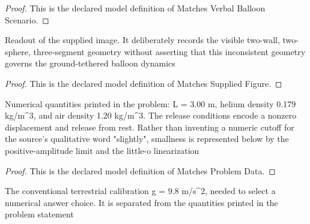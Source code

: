 \begin{proof}
  This is the declared model definition of Matches Verbal Balloon Scenario.
\end{proof}
\begin{definition}
  \label{def:physics:phyx-mini-0234:phyxminiproblems-problemphyxmini0234-matchessuppliedfigure}
  Readout of the supplied image. It deliberately records the visible two-wall, two-sphere, three-segment geometry without asserting that this inconsistent geometry governs the ground-tethered balloon dynamics
\end{definition}
\begin{proof}
  This is the declared model definition of Matches Supplied Figure.
\end{proof}
\begin{definition}
  \label{def:physics:phyx-mini-0234:phyxminiproblems-problemphyxmini0234-matchesproblemdata}
  Numerical quantities printed in the problem: L = 3.00 m, helium density 0.179 kg/m\textasciicircum{}3, and air density 1.20 kg/m\textasciicircum{}3. The release conditions encode a nonzero displacement and release from rest. Rather than inventing a numeric cutoff for the source's qualitative word "slightly", smallness is represented below by the positive-amplitude limit and the little-o linearization
\end{definition}
\begin{proof}
  This is the declared model definition of Matches Problem Data.
\end{proof}
\begin{definition}
  \label{def:physics:phyx-mini-0234:phyxminiproblems-problemphyxmini0234-usesstandardgravity}
  The conventional terrestrial calibration g = 9.8 m/s\textasciicircum{}2, needed to select a numerical answer choice. It is separated from the quantities printed in the problem statement
\end{definition}
